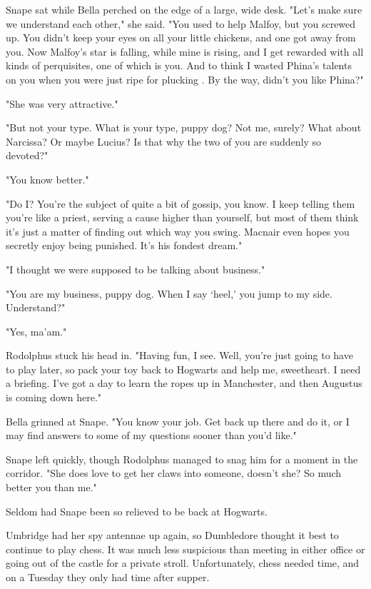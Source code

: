 \documentclass[a4paper,11pt]{article}
\begin{document}
Snape sat while Bella perched on the edge of a large, wide desk. "Let's make sure we understand each other," she said. "You used to help Malfoy, but you screwed up. You didn't keep your eyes on all your little chickens, and one got away from you. Now Malfoy's star is falling, while mine is rising, and I get rewarded with all kinds of perquisites, one of which is you. And to think I wasted Phina's talents on you when you were just ripe for plucking . By the way, didn't you like Phina?"

"She was very attractive."

"But not your type. What is your type, puppy dog? Not me, surely? What about Narcissa? Or maybe Lucius? Is that why the two of you are suddenly so devoted?"

"You know better."

"Do I? You're the subject of quite a bit of gossip, you know. I keep telling them you're like a priest, serving a cause higher than yourself, but most of them think it's just a matter of finding out which way you swing. Macnair even hopes you secretly enjoy being punished. It's his fondest dream."

"I thought we were supposed to be talking about business."

"You are my business, puppy dog. When I say `heel,' you jump to my side. Understand?"

"Yes, ma'am."

Rodolphus stuck his head in. "Having fun, I see. Well, you're just going to have to play later, so pack your toy back to Hogwarts and help me, sweetheart. I need a briefing. I've got a day to learn the ropes up in Manchester, and then Augustus is coming down here."

Bella grinned at Snape. "You know your job. Get back up there and do it, or I may find answers to some of my questions sooner than you'd like."

Snape left quickly, though Rodolphus managed to snag him for a moment in the corridor. "She does love to get her claws into someone, doesn't she? So much better you than me."

Seldom had Snape been so relieved to be back at Hogwarts.

Umbridge had her spy antennae up again, so Dumbledore thought it best to continue to play chess. It was much less suspicious than meeting in either office or going out of the castle for a private stroll. Unfortunately, chess needed time, and on a Tuesday they only had time after supper.
\end{document}
